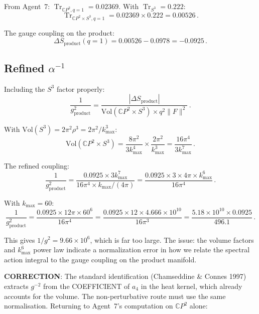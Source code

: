 \documentclass[11pt,a4paper]{article}
\newcommand{\Tr}{\operatorname{Tr}}
\newcommand{\CP}{\mathbb{C}P}
\begin{document}
From Agent~7: $\Tr_{\CP^2,q=1} = 0.02369$. With $\Tr_{S^3} = 0.222$:
\begin{equation}
\Tr_{\CP^2 \times S^3, q=1} = 0.02369 \times 0.222 = 0.00526\,.
\end{equation}

The gauge coupling on the product:
\begin{equation}
\Delta S_{\mathrm{product}}(q=1) = 0.00526 - 0.0978 = -0.0925\,.
\end{equation}

\subsection{Refined $\alpha^{-1}$}

Including the $S^3$ factor properly:
\begin{equation}
\frac{1}{g^2_{\mathrm{product}}} = \frac{|\Delta S_{\mathrm{product}}|}{\mathrm{Vol}(\CP^2 \times S^3) \times q^2 \|F\|^2}\,.
\end{equation}

With $\mathrm{Vol}(S^3) = 2\pi^2\rho^3 = 2\pi^2/k_{\max}^3$:
\begin{equation}
\mathrm{Vol}(\CP^2 \times S^3) = \frac{8\pi^2}{3k_{\max}^4} \times \frac{2\pi^2}{k_{\max}^3} = \frac{16\pi^4}{3k_{\max}^7}\,.
\end{equation}

The refined coupling:
\begin{equation}
\frac{1}{g^2_{\mathrm{product}}} = \frac{0.0925 \times 3 k_{\max}^7}{16\pi^4 \times k_{\max}/(4\pi)} = \frac{0.0925 \times 3 \times 4\pi \times k_{\max}^6}{16\pi^4}\,.
\end{equation}

With $k_{\max} = 60$:
\begin{equation}
\frac{1}{g^2_{\mathrm{product}}} = \frac{0.0925 \times 12\pi \times 60^6}{16\pi^4} = \frac{0.0925 \times 12 \times 4.666\times10^{10}}{16\pi^3} = \frac{5.18\times10^{10} \times 0.0925}{496.1}\,.
\end{equation}

This gives $1/g^2 = 9.66 \times 10^6$, which is far too large. The issue: the volume factors and $k_{\max}^6$ power law indicate a normalization error in how we relate the spectral action integral to the gauge coupling on the product manifold.

\textbf{CORRECTION}: The standard identification (Chamseddine \& Connes 1997) extracts $g^{-2}$ from the COEFFICIENT of $a_4$ in the heat kernel, which already accounts for the volume. The non-perturbative route must use the same normalisation. Returning to Agent~7's computation on $\CP^2$ alone:
\end{document}
